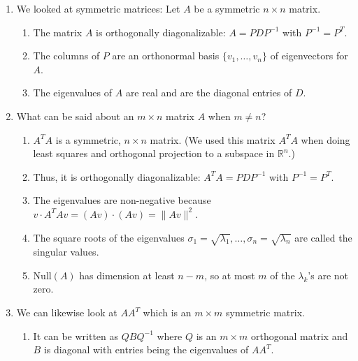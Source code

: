 \documentclass[12pt,letterpaper]{article}
\begin{document}
\begin{enumerate}
    \setlength{\itemsep}{5em}

    \item We looked at symmetric matrices: Let $A$ be a symmetric $n \times n$ matrix.
    \begin{enumerate}    \setlength{\itemsep}{3em}

        \item The matrix $A$ is orthogonally diagonalizable: $A = P D P^{-1}$ with $P^{-1} = P^T$.
        \item The columns of $P$ are an orthonormal basis $\{v_1, \dots, v_n\}$ of eigenvectors for $A$.
        \item The eigenvalues of $A$ are real and are the diagonal entries of $D$.
    \end{enumerate}

    \item What can be said about an $m \times n$ matrix $A$ when $m \neq n$?
    \begin{enumerate}    \setlength{\itemsep}{3em}

        \item $A^T A$ is a symmetric, $n \times n$ matrix. (We used this matrix $A^T A$ when doing least squares and orthogonal projection to a subspace in $\mathbb{R}^n$.)
        \item Thus, it is orthogonally diagonalizable: $A^T A = P D P^{-1}$ with $P^{-1} = P^T$.
        \item The eigenvalues are non-negative because $v \cdot A^T A v = (A v) \cdot (A v) = \|A v\|^2$.
        \item The square roots of the eigenvalues $\sigma_1 = \sqrt{\lambda_1}, \dots, \sigma_n = \sqrt{\lambda_n}$ are called the singular values.
        \item $\text{Null}(A)$ has dimension at least $n - m$, so at most $m$ of the $\lambda_k$'s are not zero.
    \end{enumerate}

\newpage

    \item We can likewise look at $A A^T$ which is an $m \times m$ symmetric matrix.
    \begin{enumerate}    \setlength{\itemsep}{5em}

        \item It can be written as $Q B Q^{-1}$ where $Q$ is an $m \times m$ orthogonal matrix and $B$ is diagonal with entries being the eigenvalues of $A A^T$.
    \end{enumerate}


\end{enumerate}
\end{document}
